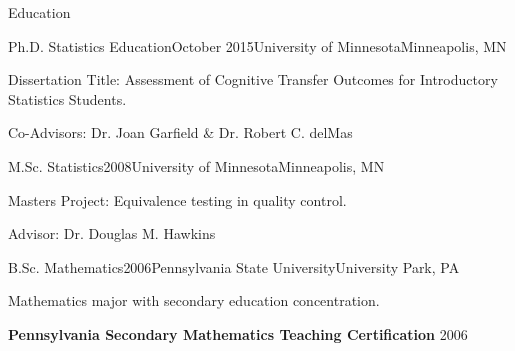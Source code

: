 \documentclass{resume} %
\begin{document}

\begin{rSection}{Education}

\begin{rSubsection}{Ph.D. Statistics Education}{October 2015}{University of Minnesota}{Minneapolis, MN}
	\item[] Dissertation Title: Assessment of Cognitive Transfer Outcomes for Introductory Statistics Students.
	\item[] Co-Advisors: Dr. Joan Garfield \& Dr. Robert C. delMas 
\end{rSubsection}

\begin{rSubsection}{M.Sc. Statistics}{2008}{University of Minnesota}{Minneapolis, MN}
	\item[] Masters Project: Equivalence testing in quality control.
	\item[] Advisor: Dr. Douglas M. Hawkins 
\end{rSubsection}

\begin{rSubsection}{B.Sc. Mathematics}{2006}{Pennsylvania State University}{University Park, PA}
	\item[] Mathematics major with secondary education concentration.
\end{rSubsection}

\textbf{Pennsylvania Secondary Mathematics Teaching Certification} \hfill 2006
\vspace{0.5em}

\end{rSection}

\end{document}
